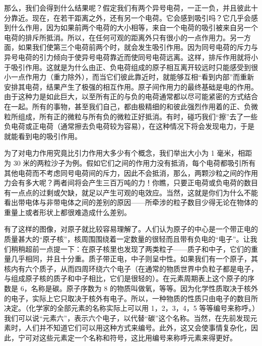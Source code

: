 那么，我们会得到什么结果呢？假定我们有两个异号电荷，一正一负，并且彼此十分靠近。现在，在若干距离之外，还有另一个电荷。它会感到吸引吗？它几乎会感到什么作用，因为如果前两个电荷的大小相等，来自一个电荷的吸引被来自另一个电荷的排斥所抵消。所以，在任何可观的距离外只有很小的一点作用力。另一方面，如果我们使第三个电荷前两个时，就会发生吸引作用。因为同号电荷的斥力与异号电荷的引力倾向于使异号电荷靠近而使同号电荷远离。这样，排斥作用就将小于吸引作用。这就是为什么由正、负电荷组成的原子相互离开较远时只能感受到很小一点作用力（重力除外），而当它们彼此靠近时，就能够互相“看到内部”而重新安排其电荷，结果产生了极强的相互作用。原子间作用力的最终基础是电的作用。由于这种力是如此巨大，以至所有正的与负的电荷通常都以尽可能紧密的方式结合在一起。所有的事物，甚至我们自己，都由极精细的和彼此强烈作用着的正、负微粒所组成，所有正的微粒与所有负的微粒正好抵消。有时，碰巧我们“擦”去了一些负电荷或正电荷（通常擦去负电荷较为容易），在这种情况下将会发现电力，于是就能看到电的吸引作用。

为了对电力作用究竟比引力作用大多少有个概念，我们举出大小为 1 毫米，相距为 30 米的两粒沙子为例。假如它们之间的作用力没有抵消，每个电荷都吸引所有其他电荷而不考虑同号电荷间的斥力，因此不会抵消，那么，两颗沙粒之间的作用力会有多大呢？两者间将会产生三百万吨的力！你瞧，只要正电荷或负电荷的数目有一点点的过剩或欠缺，就足以产生可观的电效应。当然，这就是你们为什么不能看出带电体与非带电体之间的差别的原因——所牵涉的粒子数目少得无论在物体的重量上或者形状上都很难造成什么差别。

有了这样的图像，对原子就比较容易理解了。人们认为原子的中心是一个带正电的质量甚大的“原子核”，核周围围绕着一定数量的很轻而且带有负电的“电子”。让我们稍稍超前一点提一下：在原子核里也发现了两类粒子——质子和中子，它们的重量几乎相同，并且十分重。质子带正电，中子则呈中性。如果我们有一个原子，其核内有六个质子，从而四周环绕六个电子（在通常的物质世界中负粒子都是电子，与组成原子核的质子和中子相比，它们是很轻的）。在元素周期表上这个原子的序数是 6，名称是碳。原子序数为 8 的物质叫做氧，等等。因为化学性质取决于核外的电子，实际上它只取决于核外有电子。所以，一种物质的性质只由电子的数目所决定。（化学家的全部元素的名称实际上可以用 1，2，3，4，5 等等编号来称呼。）我们可以说“元素六”，表示六个电子，以代替“碳”这个名称。当然，在先前发现元素时，人们并不知道它们可以用这种方式来编号。此外，这又会使事情复杂化，因此，宁可对这些元素定一个名称和符号，这比用编号来称呼元素来得更好。

